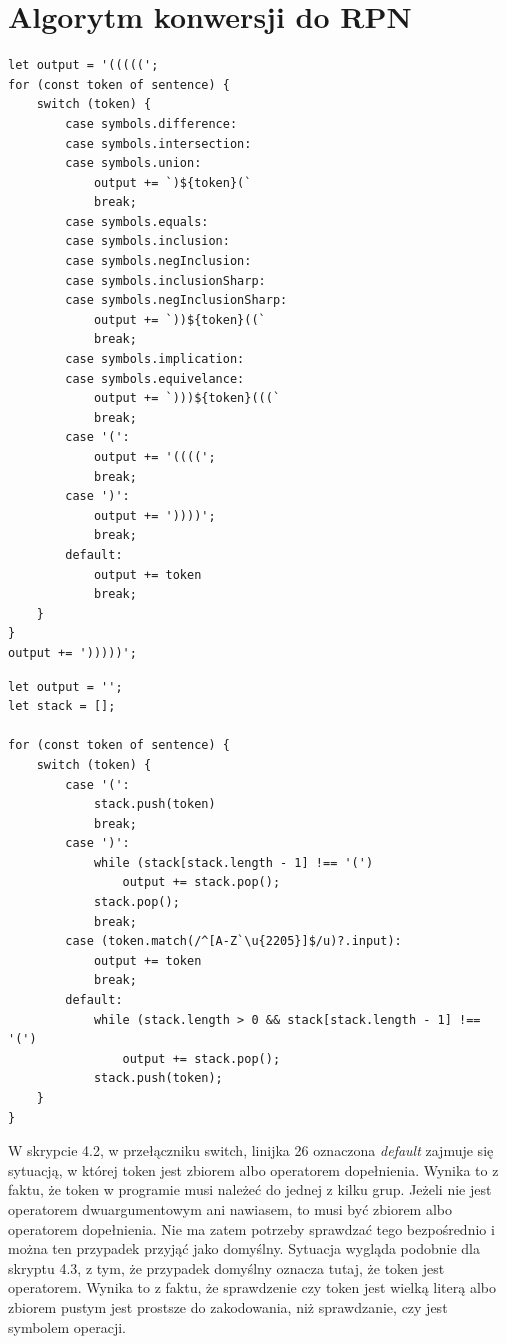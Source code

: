 \documentclass{SGGW-thesis}
\begin{document}
\newpage 
\section{Algorytm konwersji do RPN}
\begin{lstlisting}[style=JavaScript, caption={Kod dodający nawiasy do początkowego zdania}]
let output = '(((((';
for (const token of sentence) { 
    switch (token) {
        case symbols.difference:
        case symbols.intersection:
        case symbols.union:
            output += `)${token}(`
            break;
        case symbols.equals:
        case symbols.inclusion:
        case symbols.negInclusion:
        case symbols.inclusionSharp:
        case symbols.negInclusionSharp:
            output += `))${token}((`
            break;
        case symbols.implication:
        case symbols.equivelance:
            output += `)))${token}(((`
            break;
        case '(':
            output += '((((';
            break;
        case ')':
            output += '))))';
            break;
        default:
            output += token
            break;
    }
}
output += ')))))';
\end{lstlisting}
\newpage
\begin{lstlisting}[style=JavaScript, caption={Kod konwertujący zdanie z nawiasami do RPN}]
let output = '';
let stack = [];

for (const token of sentence) {
    switch (token) {
        case '(':
            stack.push(token)
            break;
        case ')':
            while (stack[stack.length - 1] !== '(') 
                output += stack.pop();
            stack.pop();
            break;
        case (token.match(/^[A-Z`\u{2205}]$/u)?.input):
            output += token
            break;
        default:
            while (stack.length > 0 && stack[stack.length - 1] !== '(') 
                output += stack.pop();
            stack.push(token);
    }
}
\end{lstlisting}

\begin{paragraph}{}
    W skrypcie 4.2, w przełączniku switch, linijka 26 oznaczona \emph{default} zajmuje się sytuacją, w której token jest zbiorem albo operatorem dopełnienia. Wynika to z faktu, że token w programie musi należeć do jednej z kilku grup. Jeżeli nie jest operatorem dwuargumentowym ani nawiasem, to musi być zbiorem albo operatorem dopełnienia. Nie ma zatem potrzeby sprawdzać tego bezpośrednio i można ten przypadek przyjąć jako domyślny. Sytuacja wygląda podobnie dla skryptu 4.3, z tym, że przypadek domyślny oznacza tutaj, że token jest operatorem. Wynika to z faktu, że sprawdzenie czy token jest wielką literą albo zbiorem pustym jest prostsze do zakodowania, niż sprawdzanie, czy jest symbolem operacji.
\end{paragraph}
\end{document}

